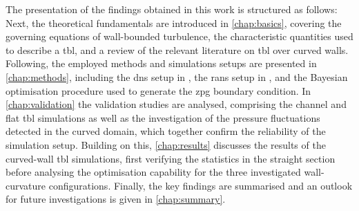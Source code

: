 The presentation of the findings obtained in this work is structured as follows: 
Next, the theoretical fundamentals are introduced in \autoref{chap:basics}, covering the governing equations of wall-bounded turbulence, the characteristic quantities used to describe a \acrshort{tbl}, and a review of the relevant literature on \acrshort{tbl} over curved walls.
Following, the employed methods and simulations setups are presented in \autoref{chap:methods}, including the \acrshort{dns} setup in , the \acrshort{rans} setup in , and the Bayesian optimisation procedure used to generate the \acrshort{zpg} boundary condition.
In \autoref{chap:validation} the validation studies are analysed, comprising the channel and flat \acrshort{tbl} simulations as well as the investigation of the pressure fluctuations detected in the curved domain, which together confirm the reliability of the simulation setup.
Building on this, \autoref{chap:results} discusses the results of the curved-wall \acrshort{tbl} simulations, first verifying the statistics in the straight section before analysing the optimisation capability for the three investigated wall-curvature configurations.
Finally, the key findings are summarised and an outlook for future investigations is given in \autoref{chap:summary}.





